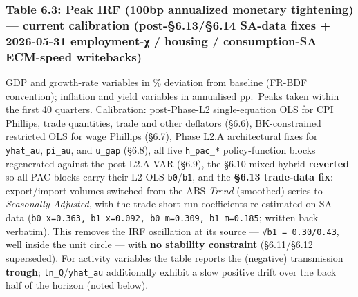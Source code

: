 \documentclass[
]{article}
\begin{document}
\subsubsection{Table 6.3: Peak IRF (100bp annualized monetary
tightening) --- current calibration (post-§6.13/§6.14 SA-data fixes +
2026-05-31 employment-χ / housing / consumption-SA ECM-speed
writebacks)}\label{table-6.3-peak-irf-100bp-annualized-monetary-tightening-current-calibration-post-6.136.14-sa-data-fixes-2026-05-31-employment-ux3c7-housing-consumption-sa-ecm-speed-writebacks}

GDP and growth-rate variables in \% deviation from baseline (FR-BDF
convention); inflation and yield variables in annualised pp.~Peaks taken
within the first 40 quarters. Calibration: post-Phase-L2 single-equation
OLS for CPI Phillips, trade quantities, trade and other deflators
(§6.6), BK-constrained restricted OLS for wage Phillips (§6.7), Phase
L2.A architectural fixes for \texttt{yhat\_au}, \texttt{pi\_au}, and
\texttt{u\_gap} (§6.8), all five \texttt{h\_pac\_*} policy-function
blocks regenerated against the post-L2.A VAR (§6.9), the §6.10 mixed
hybrid \textbf{reverted} so all PAC blocks carry their L2 OLS
\texttt{b0}/\texttt{b1}, and the \textbf{§6.13 trade-data fix}:
export/import volumes switched from the ABS \emph{Trend} (smoothed)
series to \emph{Seasonally Adjusted}, with the trade short-run
coefficients re-estimated on SA data
(\texttt{b0\_x=0.363,\ b1\_x=0.092,\ b0\_m=0.309,\ b1\_m=0.185}; written
back verbatim). This removes the IRF oscillation at its source ---
\texttt{√b1\ =\ 0.30/0.43}, well inside the unit circle --- with
\textbf{no stability constraint} (§6.11/§6.12 superseded). For activity
variables the table reports the (negative) transmission \textbf{trough};
\texttt{ln\_Q}/\texttt{yhat\_au} additionally exhibit a slow positive
drift over the back half of the horizon (noted below).
\end{document}
